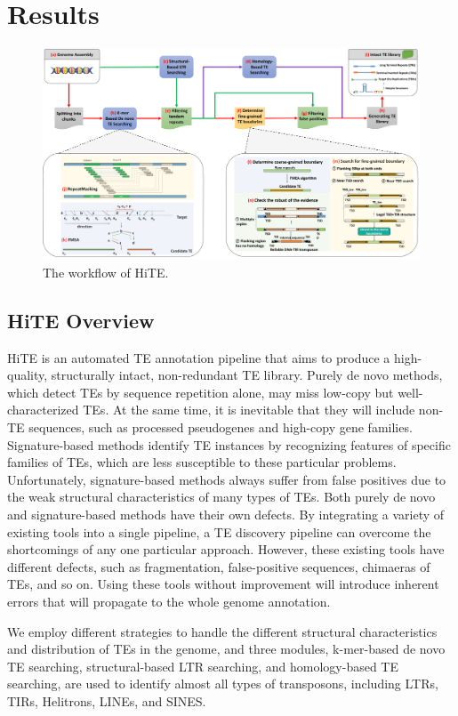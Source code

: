 \documentclass{bmcart}
\begin{document}
\section*{Results}
\begin{figure}[h!]
	\centerline{\includegraphics[width=1.0\textwidth]{figures/Framework1.pdf}}
	\caption{The workflow of HiTE.}
	\label{fig:framework}
\end{figure}
\subsection*{HiTE Overview}
HiTE is an automated TE annotation pipeline that aims to produce a high-quality, structurally intact, non-redundant TE library. Purely de novo methods, which detect TEs by sequence repetition alone, may miss low-copy but well-characterized TEs. At the same time, it is inevitable that they will include non-TE sequences, such as processed pseudogenes and high-copy gene families. Signature-based methods identify TE instances by recognizing features of specific families of TEs, which are less susceptible to these particular problems. Unfortunately, signature-based methods always suffer from false positives due to the weak structural characteristics of many types of TEs. Both purely de novo and signature-based methods have their own defects. By integrating a variety of existing tools into a single pipeline, a TE discovery pipeline can overcome the shortcomings of any one particular approach. However, these existing tools have different defects, such as fragmentation, false-positive sequences, chimaeras of TEs, and so on. Using these tools without improvement will introduce inherent errors that will propagate to the whole genome annotation.

We employ different strategies to handle the different structural characteristics and distribution of TEs in the genome, and three modules, k-mer-based de novo TE searching, structural-based LTR searching, and homology-based TE searching, are used to identify almost all types of transposons, including LTRs, TIRs, Helitrons, LINEs, and SINES.
\end{document}
